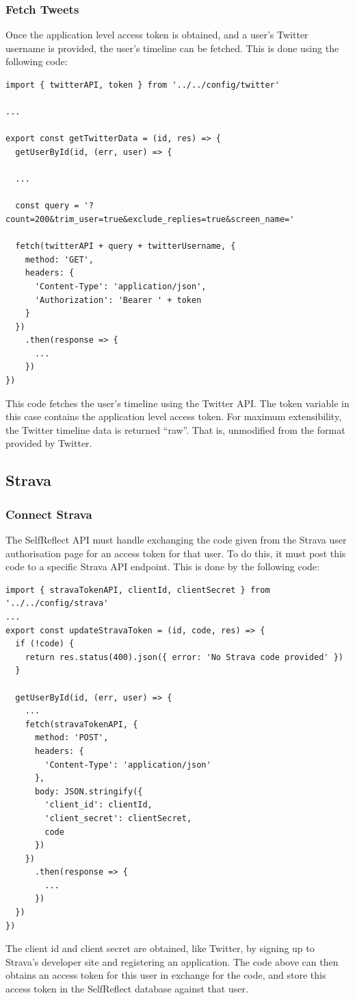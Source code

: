 \documentclass[11pt,openright,a4paper]{report}
\begin{document}
\subsubsection{Fetch Tweets}
Once the application level access token is obtained, and a user's Twitter username is provided, the user's timeline can be fetched. This is done using the following code:
\begin{lstlisting}
import { twitterAPI, token } from '../../config/twitter'

...

export const getTwitterData = (id, res) => {
  getUserById(id, (err, user) => {

  ...

  const query = '?count=200&trim_user=true&exclude_replies=true&screen_name='

  fetch(twitterAPI + query + twitterUsername, {
    method: 'GET',
    headers: {
      'Content-Type': 'application/json',
      'Authorization': 'Bearer ' + token
    }
  })
    .then(response => {
      ...
    })
})
\end{lstlisting}
This code fetches the user's timeline using the Twitter API. The token variable in this case contains the application level access token. For maximum extensibility, the Twitter timeline data is returned \enquote{raw}. That is, unmodified from the format provided by Twitter.

\subsection{Strava} \label{sec:apiconnectstrava}
\subsubsection{Connect Strava}
The SelfReflect API must handle exchanging the code given from the Strava user authorisation page for an access token for that user. To do this, it must post this code to a specific Strava API endpoint. This is done by the following code:
\begin{lstlisting}
import { stravaTokenAPI, clientId, clientSecret } from '../../config/strava'
...
export const updateStravaToken = (id, code, res) => {
  if (!code) {
    return res.status(400).json({ error: 'No Strava code provided' })
  }

  getUserById(id, (err, user) => {
    ...
    fetch(stravaTokenAPI, {
      method: 'POST',
      headers: {
        'Content-Type': 'application/json'
      },
      body: JSON.stringify({
        'client_id': clientId,
        'client_secret': clientSecret,
        code
      })
    })
      .then(response => {
        ...
      })
  })
})
\end{lstlisting}
The client id and client secret are obtained, like Twitter, by signing up to Strava's developer site and registering an application. The code above can then obtains an access token for this user in exchange for the code, and store this access token in the SelfReflect database against that user.
\end{document}
